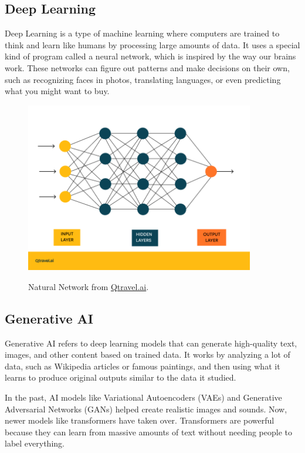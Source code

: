 \documentclass[12pt,oneside,openright,a4paper]{cpe-english-project}
\begin{document}
\subsection{Deep Learning} Deep Learning is a type of machine learning where computers are trained to think and learn like humans by processing large amounts of data. It uses a special kind of program called a neural network, which is inspired by the way our brains work. These networks can figure out patterns and make decisions on their own, such as recognizing faces in photos, translating languages, or even predicting what you might want to buy.

\begin{figure}[H]
\centering
\includegraphics[width=10cm]{./assets/Natural-Network.png}
\label{fig:figure-2.3}
\caption{Natural Network from 
\href{https://www.qtravel.ai/wp-content/uploads/2023/07/sieci-neuronowe-grafika-768x570.png}{Qtravel.ai}.}
\end{figure}

\subsection{Generative AI} Generative AI refers to deep learning models that can generate high-quality text, images, and other content based on trained data.  It works by analyzing a lot of data, such as Wikipedia articles or famous paintings, and then using what it learns to produce original outputs similar to the data it studied. \par
In the past, AI models like Variational Autoencoders (VAEs) and Generative Adversarial Networks (GANs) helped create realistic images and sounds. Now, newer models like transformers have taken over. Transformers are powerful because they can learn from massive amounts of text without needing people to label everything.
\end{document}
